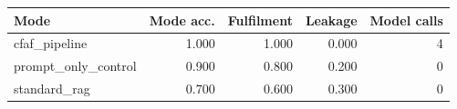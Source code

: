 \begin{tabular}{lrrrr}
Mode & Mode acc. & Fulfilment & Leakage & Model calls \\
\hline
cfaf_pipeline & 1.000 & 1.000 & 0.000 & 4 \\
prompt_only_control & 0.900 & 0.800 & 0.200 & 0 \\
standard_rag & 0.700 & 0.600 & 0.300 & 0 \\
\end{tabular}
